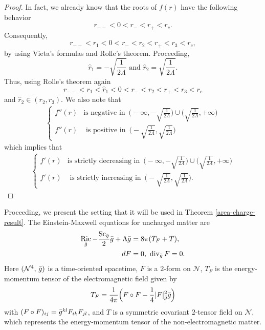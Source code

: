 \documentclass[a4paper, 11pt, reqno]{amsart}
\newcommand{\diver}{\operatorname{div}}
\DeclareMathOperator{\Ric}{Ric}
\newcommand{\s}{\operatorname{Sc}}
\begin{document}
\begin{proof}
   In fact, we already know that the roots of $f(r)$ have the following behavior
$$r_{--}<0<r_{-}<r_{+}<r_{c}.$$
Consequently,
 $$r_{--}<r_1<0<r_{-}<r_2<r_{+}<r_3<r_c,$$
 by using Vieta's formulas and Rolle's theorem.
 Proceeding, 
$$\hat{r}_1=-\sqrt{\frac{1}{2\Lambda}}\,\,\mbox{and}\,\,\hat{r}_2=\sqrt{\frac{1}{2\Lambda}}.$$
 Thus, using Rolle's theorem again
 $$r_{--}<r_1<\hat{r}_1<0<r_{-}<r_2<r_{+}<r_3<r_c$$
and $\hat{r}_2\in (r_2,r_3).$ We also note that
\begin{eqnarray*}
\left\{\begin{array}{rc}
f''(r) &\mbox{is negative in}\,\,\, \Big(-\infty,-\sqrt{\frac{1}{2\Lambda}}\Big)\cup\Big(\sqrt{\frac{1}{2\Lambda}},+\infty\Big)\\
f''(r)  &\mbox{ is positive in}\,\,\, \Big(-\sqrt{\frac{1}{2\Lambda}},\sqrt{\frac{1}{2\Lambda}}\Big)
\end{array}\right.
\end{eqnarray*} 
which implies that
\begin{eqnarray*}
\left\{\begin{array}{rc}
f'(r) &\mbox{is strictly decreasing in}\,\,\, \Big(-\infty,-\sqrt{\frac{1}{2\Lambda}}\Big)\cup\Big(\sqrt{\frac{1}{2\Lambda}},+\infty\Big)\\
f'(r)  &\mbox{ is strictly increasing in}\,\,\, \Big(-\sqrt{\frac{1}{2\Lambda}},\sqrt{\frac{1}{2\Lambda}}\Big).
\end{array}\right.
\end{eqnarray*} 
\end{proof}
 



Proceeding, we present the setting that it will be used in Theorem \ref{area-charge-result}. The Einstein-Maxwell equations for uncharged matter are
  \begin{align*}
\Ric_{\Bar{g}}-\frac{\s_{\Bar{g}}}{2}\Bar{g}+\Lambda\Bar{g} &=8\pi(T_{F}+T),\\
d F &=0,\,\, \diver_{\Bar{g}} F=0. 
\end{align*}
Here $(\mathcal{N}^4,\,\Bar{g})$ is a time-oriented spacetime, $F$ is a $2$-form on $\mathcal{N}$,  $T_{F}$ is the energy-momentum tensor of the electromagnetic field given by
\begin{equation*}
    T_{F}=\frac{1}{4\pi}\Big( F\circ F-\frac{1}{4}|F|^2_{\Bar{g}}\Bar{g}\Big)
\end{equation*}
with $(F\circ F)_{ij}=\Bar{g}^{kl} F_{ik} F_{jl}$, and $T$ is a symmetric covariant $2$-tensor field on $\mathcal{N}$, which represents the energy-momentum tensor of the non-electromagnetic matter.
\end{document}
